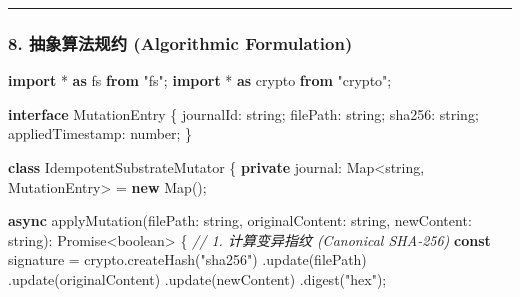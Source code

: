 \documentclass[
]{ctexart}
\newenvironment{Shaded}{}{}
\newcommand{\BuiltInTok}[1]{\textcolor[rgb]{0.00,0.50,0.00}{#1}}
\newcommand{\CommentTok}[1]{\textcolor[rgb]{0.38,0.63,0.69}{\textit{#1}}}
\newcommand{\DataTypeTok}[1]{\textcolor[rgb]{0.56,0.13,0.00}{#1}}
\newcommand{\FunctionTok}[1]{\textcolor[rgb]{0.02,0.16,0.49}{#1}}
\newcommand{\ImportTok}[1]{\textcolor[rgb]{0.00,0.50,0.00}{\textbf{#1}}}
\newcommand{\KeywordTok}[1]{\textcolor[rgb]{0.00,0.44,0.13}{\textbf{#1}}}
\newcommand{\NormalTok}[1]{#1}
\newcommand{\OperatorTok}[1]{\textcolor[rgb]{0.40,0.40,0.40}{#1}}
\newcommand{\StringTok}[1]{\textcolor[rgb]{0.25,0.44,0.63}{#1}}
\renewcommand{\_}{\discretionary{}{}{\textunderscore}}
\begin{document}
\begin{center}\rule{0.5\linewidth}{0.5pt}\end{center}

\subsubsection{8. 抽象算法规约 (Algorithmic
Formulation)}\label{ux62bdux8c61ux7b97ux6cd5ux89c4ux7ea6-algorithmic-formulation-7}

\begin{Shaded}
\begin{Highlighting}[]
\ImportTok{import} \OperatorTok{*} \ImportTok{as}\NormalTok{ fs }\ImportTok{from} \StringTok{"fs"}\OperatorTok{;}
\ImportTok{import} \OperatorTok{*} \ImportTok{as}\NormalTok{ crypto }\ImportTok{from} \StringTok{"crypto"}\OperatorTok{;}

\KeywordTok{interface}\NormalTok{ MutationEntry \{}
\NormalTok{  journalId}\OperatorTok{:} \DataTypeTok{string}\OperatorTok{;}
\NormalTok{  filePath}\OperatorTok{:} \DataTypeTok{string}\OperatorTok{;}
\NormalTok{  sha256}\OperatorTok{:} \DataTypeTok{string}\OperatorTok{;}
\NormalTok{  appliedTimestamp}\OperatorTok{:} \DataTypeTok{number}\OperatorTok{;}
\NormalTok{\}}

\KeywordTok{class}\NormalTok{ IdempotentSubstrateMutator \{}
  \KeywordTok{private}\NormalTok{ journal}\OperatorTok{:} \BuiltInTok{Map}\OperatorTok{\textless{}}\DataTypeTok{string}\OperatorTok{,}\NormalTok{ MutationEntry}\OperatorTok{\textgreater{}} \OperatorTok{=} \KeywordTok{new} \BuiltInTok{Map}\NormalTok{()}\OperatorTok{;}

  \KeywordTok{async} \FunctionTok{applyMutation}\NormalTok{(filePath}\OperatorTok{:} \DataTypeTok{string}\OperatorTok{,}\NormalTok{ originalContent}\OperatorTok{:} \DataTypeTok{string}\OperatorTok{,}\NormalTok{ newContent}\OperatorTok{:} \DataTypeTok{string}\NormalTok{)}\OperatorTok{:} \BuiltInTok{Promise}\OperatorTok{\textless{}}\DataTypeTok{boolean}\OperatorTok{\textgreater{}}\NormalTok{ \{}
    \CommentTok{// 1. 计算变异指纹 (Canonical SHA{-}256)}
    \KeywordTok{const}\NormalTok{ signature }\OperatorTok{=}\NormalTok{ crypto}\OperatorTok{.}\FunctionTok{createHash}\NormalTok{(}\StringTok{"sha256"}\NormalTok{)}
      \OperatorTok{.}\FunctionTok{update}\NormalTok{(filePath)}
      \OperatorTok{.}\FunctionTok{update}\NormalTok{(originalContent)}
      \OperatorTok{.}\FunctionTok{update}\NormalTok{(newContent)}
      \OperatorTok{.}\FunctionTok{digest}\NormalTok{(}\StringTok{"hex"}\NormalTok{)}\OperatorTok{;}


\end{Highlighting}
\end{Shaded}
\end{document}

